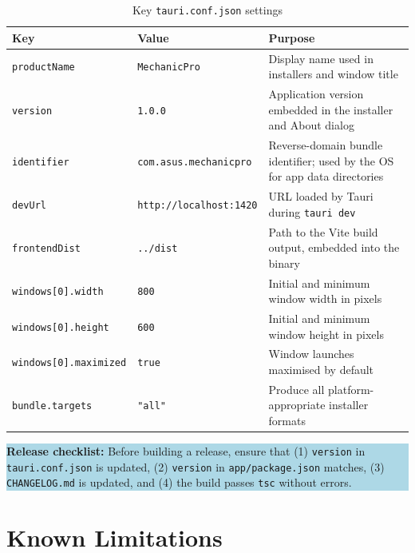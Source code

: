 \documentclass[12pt, a4paper]{report}
\newcommand{\infobox}[1]{%
	\vspace{6pt}
	\noindent
	\colorbox{LightBlue}{%
		\begin{minipage}{\dimexpr\linewidth-2\fboxsep}%
			\vspace{4pt}
			\small #1
			\vspace{4pt}
		\end{minipage}%
	}
	\vspace{6pt}
}
\begin{document}
	\begin{table}[H]
		\centering
		\begin{tabularx}{\textwidth}{l l X}
			\toprule
			\textbf{Key}              & \textbf{Value}              & \textbf{Purpose} \\
			\midrule
			\texttt{productName}      & \texttt{MechanicPro}        & Display name used in installers and window title \\
			\texttt{version}          & \texttt{1.0.0}              & Application version embedded in the installer and About dialog \\
			\texttt{identifier}       & \texttt{com.asus.mechanicpro} & Reverse-domain bundle identifier; used by the OS for app data directories \\
			\texttt{devUrl}           & \texttt{http://localhost:1420} & URL loaded by Tauri during \texttt{tauri dev} \\
			\texttt{frontendDist}     & \texttt{../dist}            & Path to the Vite build output, embedded into the binary \\
			\texttt{windows[0].width} & \texttt{800}                & Initial and minimum window width in pixels \\
			\texttt{windows[0].height}& \texttt{600}                & Initial and minimum window height in pixels \\
			\texttt{windows[0].maximized} & \texttt{true}           & Window launches maximised by default \\
			\texttt{bundle.targets}   & \texttt{"all"}              & Produce all platform-appropriate installer formats \\
			\bottomrule
		\end{tabularx}
		\caption{Key \texttt{tauri.conf.json} settings}
		\label{tab:config}
	\end{table}

	\infobox{\textbf{Release checklist:} Before building a release, ensure that
		(1) \texttt{version} in \texttt{tauri.conf.json} is updated,
		(2) \texttt{version} in \texttt{app/package.json} matches,
		(3) \texttt{CHANGELOG.md} is updated, and
		(4) the build passes \texttt{tsc} without errors.}

	\chapter{Known Limitations}
\end{document}
